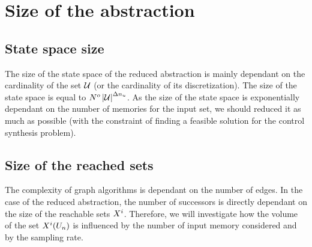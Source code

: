 \section{Size of the abstraction}
%
%
%

\subsection{State space size}
The size of the state space of the reduced abstraction is mainly dependant on the cardinality of the set $\mathcal{U}$ (or the cardinality of its discretization).
The size of the state space is equal to $N^o \left|\mathcal{U}\right|^{\Delta n_u}$.
As the size of the state space is exponentially dependant on the number of memories for the input set, we should reduced it as much as possible (with the constraint of finding a feasible solution for the control synthesis problem).

\subsection{Size of the reached sets}
The complexity of graph algorithms is dependant on the number of edges.
In the case of the reduced abstraction, the number of successors is directly dependant on the size of the reachable sets $X^i$.
Therefore, we will investigate how the volume of the set  $X^i(U_n)$ is influenced by the number of input memory considered and by the sampling rate.

